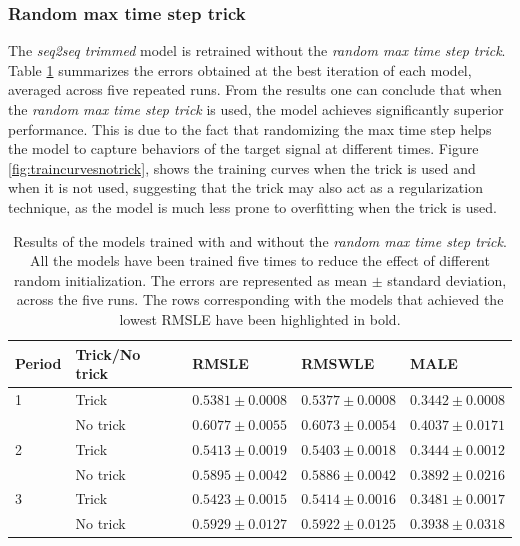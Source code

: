 \subsubsection{Random max time step trick}
The \textit{seq2seq trimmed} model is retrained without the \textit{random max time step trick}. Table \ref{tab:salesforecast_results_notrick} summarizes the errors obtained at the best iteration of each model, averaged across five repeated runs. From the results one can conclude that when the \textit{random max time step trick} is used, the model achieves significantly superior performance. This is due to the fact that randomizing the max time step helps the model to capture behaviors of the target signal at different times. Figure \ref{fig:traincurvesnotrick}, shows the training curves when the trick is used and when it is not used, suggesting that the trick may also act as a regularization technique, as the model is much less prone to overfitting when the trick is used.

	\begin{table}[h]
	\footnotesize
	\caption[Results for the \textit{random max time step trick} ablation study]{Results of the models trained with and without the \textit{random max time step trick}. All the models have been trained five times to reduce the effect of different random initialization. The errors are represented as mean $\pm$ standard deviation, across the five runs. The rows corresponding with the models that achieved the lowest RMSLE have been highlighted in bold.}
	\label{tab:salesforecast_results_notrick}
	\centering
	\begin{tabular}{lllll}
		\hline
		Period & Trick/No trick             & RMSLE                 & RMSWLE                & MALE                  \\ \hline
		1 & Trick   & $ \mathbf{0.5381 \pm 0.0008} $ & $ \mathbf{0.5377 \pm 0.0008} $ & $ \mathbf{0.3442 \pm 0.0008} $ \\
		& No trick & $ 0.6077 \pm 0.0055 $  &  $ 0.6073 \pm 0.0054 $  &  $ 0.4037 \pm 0.0171 $ \\
		\hline
		2 & Trick  & $ \mathbf{0.5413 \pm 0.0019} $ & $ \mathbf{0.5403 \pm 0.0018} $ & $ \mathbf{0.3444 \pm 0.0012} $ \\
		& No trick & $ 0.5895 \pm 0.0042 $  &  $ 0.5886 \pm 0.0042 $  &  $ 0.3892 \pm 0.0216 $ \\
		\hline
		3 & Trick  & $ \mathbf{0.5423 \pm 0.0015} $ & $ \mathbf{0.5414 \pm 0.0016} $ & $ \mathbf{0.3481 \pm 0.0017} $ \\
		& No trick & $ 0.5929 \pm 0.0127 $  &  $ 0.5922 \pm 0.0125 $  &  $ 0.3938 \pm 0.0318 $ \\
		\hline
	\end{tabular}
\end{table}


